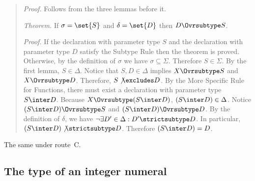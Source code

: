 \begin{description}
\begin{quote}
\emph{Proof.} Follows from the three lemmas before it.

\emph{Theorem.} If $\sigma = \set{S}$ and $\delta = \set{D}$ then
$D \Ovrsubtype S$.

\emph{Proof.} If the declaration with parameter type $S$ and the declaration
with parameter type $D$ satisfy the Subtype Rule then the theorem is
proved.  Otherwise, by the definition of $\sigma$ we have $\sigma
\subseteq \Sigma$.  Therefore $S \in \Sigma$.  By the first lemma,
$S \in \Delta$.  Notice that $S,D \in \Delta$ implies
$X \Ovrsubtype S$ and $X \Ovrsubtype D$.  Therefore, $S \not \excludes
D$.  By the More Specific Rule for Functions, there must exist a
declaration with parameter type $S \inter D$.  Because $X
\Ovrsubtype (S \inter D)$, $(S \inter D) \in \Delta$.
Notice $(S \inter D) \Ovrsubtype S$ and $(S \inter D) \Ovrsubtype D$.
By the definition of $\delta$, we have $\lnot \exists D'\in\Delta: D'
\strictsubtype D$.  In particular, $(S \inter D) \not \strictsubtype
D$.  Therefore $(S \inter D) = D$.
\end{quote}
\item[Route C] The same under route~C.
\end{description}

\subsection{The type of an integer numeral}

